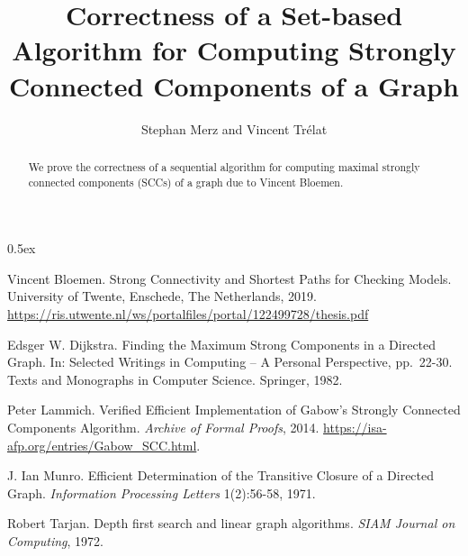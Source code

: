 \documentclass[11pt,a4paper]{article}
\begin{document}
\title{Correctness of a Set-based Algorithm for Computing Strongly Connected Components of a Graph}
\author{Stephan Merz and Vincent Trélat}
\maketitle

\begin{abstract}
  We prove the correctness of a sequential algorithm for computing 
  maximal strongly connected components (SCCs) of a graph 
  due to Vincent Bloemen.
\end{abstract}

\tableofcontents

\parindent 0pt\parskip 0.5ex



%
%

\begin{thebibliography}{9}
Vincent Bloemen.
\newblock Strong Connectivity and Shortest Paths for Checking Models.
\newblock University of Twente, Enschede, The Netherlands, 2019.
  \url{https://ris.utwente.nl/ws/portalfiles/portal/122499728/thesis.pdf}

Edsger W. Dijkstra.
\newblock Finding the Maximum Strong Components in a Directed Graph.
\newblock In: Selected Writings in Computing -- A Personal Perspective,
  pp.\ 22-30.
  Texts and Monographs in Computer Science. Springer, 1982.

Peter Lammich.
\newblock Verified Efficient Implementation of Gabow's Strongly Connected Components Algorithm.
\newblock \emph{Archive of Formal Proofs}, 2014.
  \url{https://isa-afp.org/entries/Gabow_SCC.html}.

J. Ian Munro.
\newblock Efficient Determination of the Transitive Closure of a Directed Graph.
\newblock \emph{Information Processing Letters} 1(2):56-58, 1971.

Robert Tarjan.
\newblock Depth first search and linear graph algorithms.
\newblock \emph{SIAM Journal on Computing}, 1972.
\end{thebibliography}
\end{document}
